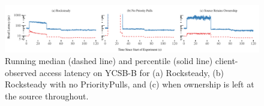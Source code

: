 \begin{figure}[t]
\includegraphics[width=\textwidth]{graphs/running-latency.pdf}
\caption{
Running median (dashed line) and \nnnth percentile (solid line)
client-observed access latency on YCSB-B for (a) Rocksteady, (b)
Rocksteady with no PriorityPulls, and (c) when ownership is left at the
source throughout.
}
\label{fig:running-latency}
\end{figure}
